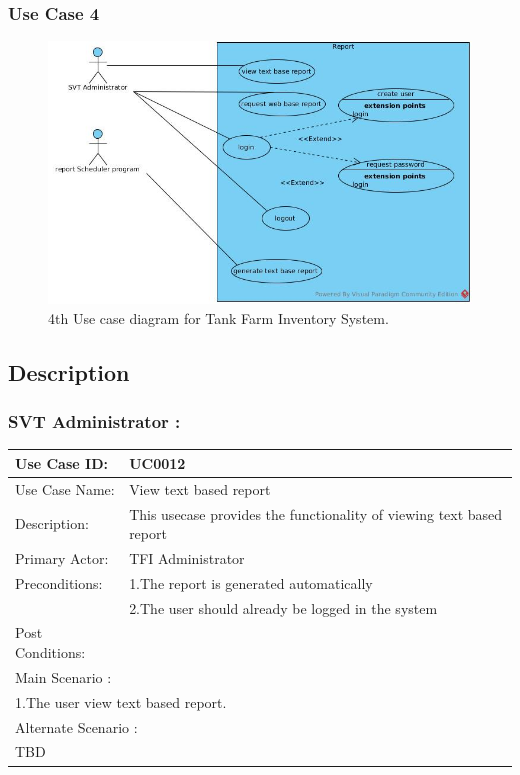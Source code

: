 \subsubsection{Use Case 4}
\vspace*{1\baselineskip}
\begin{figure}[htbp]
	\begin{center}
		\includegraphics[width=1.00\linewidth]{./images/UC004.jpeg}
		\caption{4th Use case diagram for Tank Farm Inventory System.}
		\label{fig:UC004.jpeg}
	\end{center}
\end{figure}

\nopagebreak

\subsection{Description}
\subsubsection{SVT Administrator :}
\begin{center}
\vspace*{1\baselineskip}	
\begin{tabular}{|l|p{10cm}|}
	\hline
	Use Case ID: & UC0012 \\
	\hline
	Use Case Name: & View text based report \\
	\hline
	Description: & This usecase provides the functionality of viewing text based report \\
	\hline
	Primary Actor: & TFI Administrator \\
	\hline
	Preconditions: & 1.The report is generated automatically\\ 
	& 2.The user should already be logged in the system \\
	\hline
	Post Conditions: & \\
	\hline
	\multicolumn{2}{|l|}{Main Scenario :} \\
	\hline
	\multicolumn{2}{|l|}{1.The user view text based report.} \\
	\hline
	\multicolumn{2}{|l|}{Alternate Scenario :} \\
	\hline
	\multicolumn{2}{|l|}{TBD} \\
	\hline
\end{tabular}
\end{center}

